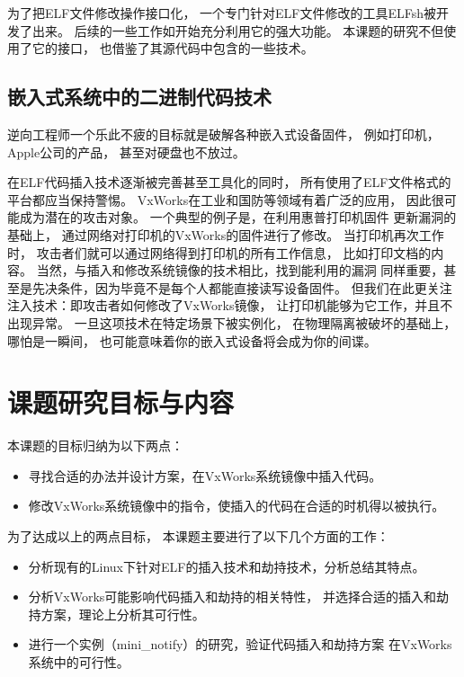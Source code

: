 为了把ELF文件修改操作接口化，
一个专门针对ELF文件修改的工具ELFsh被开发了出来。
后续的一些工作如\cite{cerberus}开始充分利用它的强大功能。
本课题的研究不但使用了它的接口，
也借鉴了其源代码中包含的一些技术。


\subsection{嵌入式系统中的二进制代码技术}

逆向工程师一个乐此不疲的目标就是破解各种嵌入式设备固件，
例如打印机，Apple公司的产品，
甚至对硬盘也不放过。


在ELF代码插入技术逐渐被完善甚至工具化的同时，
所有使用了ELF文件格式的平台都应当保持警惕。
VxWorks在工业和国防等领域有着广泛的应用，
因此很可能成为潜在的攻击对象。
一个典型的例子是\cite{printme}，在利用惠普打印机固件
更新漏洞的基础上，
通过网络对打印机的VxWorks的固件进行了修改。
当打印机再次工作时，
攻击者们就可以通过网络得到打印机的所有工作信息，
比如打印文档的内容。
当然，与插入和修改系统镜像的技术相比，找到能利用的漏洞
同样重要，甚至是先决条件，因为毕竟不是每个人都能直接读写设备固件。
但我们在此更关注注入技术：即攻击者如何修改了VxWorks镜像，
让打印机能够为它工作，并且不出现异常。
一旦这项技术在特定场景下被实例化，
在物理隔离被破坏的基础上，哪怕是一瞬间，
也可能意味着你的嵌入式设备将会成为你的间谍。

\section{课题研究目标与内容}

本课题的目标归纳为以下两点：

\begin{itemize}
  \item 寻找合适的办法并设计方案，在VxWorks系统镜像中插入代码。
  \item 修改VxWorks系统镜像中的指令，使插入的代码在合适的时机得以被执行。
\end{itemize}

为了达成以上的两点目标，
本课题主要进行了以下几个方面的工作：

\begin{itemize}
  \item 分析现有的Linux下针对ELF的插入技术和劫持技术，分析总结其特点。
  \item 分析VxWorks可能影响代码插入和劫持的相关特性，
并选择合适的插入和劫持方案，理论上分析其可行性。
  \item 进行一个实例（mini\_notify）的研究，验证代码插入和劫持方案
在VxWorks系统中的可行性。
\end{itemize}

